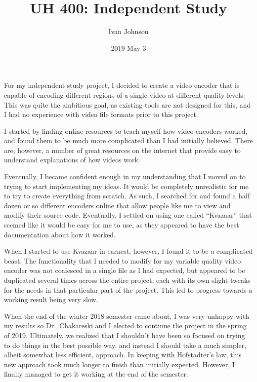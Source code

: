 \documentclass[11pt,oneside,letterpaper]{article}
\begin{document}
\title{UH 400: Independent Study}

\author{Ivan Johnson}
\date{2019 May 3}

\maketitle

For my independent study project, I decided to create a video encoder that is
capable of encoding different regions of a single video at different quality
levels. This was quite the ambitious goal, as existing tools are not designed
for this, and I had no experience with video file formats prior to this project.

I started by finding online resources to teach myself how video encoders worked,
and found them to be much more complicated than I had initially believed. There
are, however, a number of great resources on the internet that provide easy to
understand explanations of how videos work.

Eventually, I became confident enough in my understanding that I moved on to
trying to start implementing my ideas. It would be completely unrealistic for me
to try to create everything from scratch. As such, I searched for and found a
half dozen or so different encoders online that allow people like me to view and
modify their source code. Eventually, I settled on using one called ``Kvazaar''
that seemed like it would be easy for me to use, as they appeared to have the
best documentation about how it worked.

When I started to use Kvazaar in earnest, however, I found it to be a
complicated beast. The functionality that I needed to modify for my variable
quality video encoder was not coalesced in a single file as I had expected, but
appeared to be duplicated several times across the entire project, each with its
own slight tweaks for the needs in that particular part of the project. This led
to progress towards a working result being very slow.

When the end of the winter 2018 semester came about, I was very unhappy with my
results so Dr.\ Chakareski and I elected to continue the project in the spring
of 2019. Ultimately, we realized that I shouldn't have been so focused on trying
to do things in the best possible way, and instead I should take a much simpler,
albeit somewhat less efficient, approach. In keeping with Hofstadter's law, this
new approach took much longer to finish than initially expected. However, I
finally managed to get it working at the end of the semester.
\end{document}
